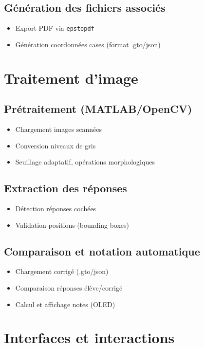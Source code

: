 \documentclass[a4paper,11pt]{article}
\begin{document}
\subsection{Génération des fichiers associés}
\begin{itemize}
    \item Export PDF via \texttt{epstopdf}
    \item Génération coordonnées cases (format .gto/json)
\end{itemize}

\section{Traitement d'image}

\subsection{Prétraitement (MATLAB/OpenCV)}
\begin{itemize}
    \item Chargement images scannées
    \item Conversion niveaux de gris
    \item Seuillage adaptatif, opérations morphologiques
\end{itemize}

\subsection{Extraction des réponses}
\begin{itemize}
    \item Détection réponses cochées
    \item Validation positions (bounding boxes)
\end{itemize}

\subsection{Comparaison et notation automatique}
\begin{itemize}
    \item Chargement corrigé (.gto/json)
    \item Comparaison réponses élève/corrigé
    \item Calcul et affichage notes (OLED)
\end{itemize}

\section{Interfaces et interactions}
\end{document}
